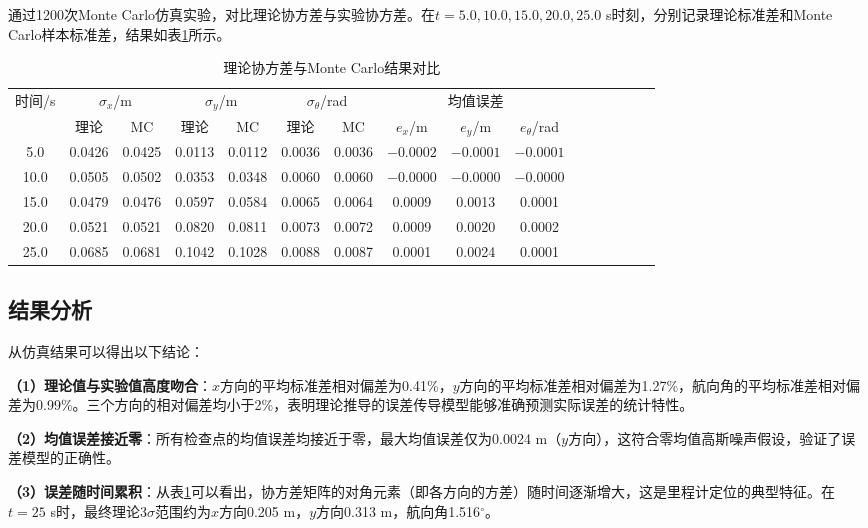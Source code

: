 \documentclass[12pt,a4paper]{article}
\begin{document}
通过1200次Monte Carlo仿真实验，对比理论协方差与实验协方差。在$t=5.0, 10.0, 15.0, 20.0, 25.0$ s时刻，分别记录理论标准差和Monte Carlo样本标准差，结果如表\ref{tab:results}所示。

\begin{table}[H]
\centering
\caption{理论协方差与Monte Carlo结果对比}
\label{tab:results}
\begin{adjustbox}{max width=\textwidth}
\begin{tabular}{c*{2}{cc}*{2}{cc}*{2}{cc}ccc}
\toprule
\multirow{2}{*}{时间/s} & \multicolumn{2}{c}{$\sigma_x$/m} & \multicolumn{2}{c}{$\sigma_y$/m} & \multicolumn{2}{c}{$\sigma_\theta$/rad} & \multicolumn{3}{c}{均值误差} \\
\cmidrule(lr){2-3} \cmidrule(lr){4-5} \cmidrule(lr){6-7} \cmidrule(lr){8-10}
 & 理论 & MC & 理论 & MC & 理论 & MC & $e_x$/m & $e_y$/m & $e_\theta$/rad \\
\midrule
5.0 & 0.0426 & 0.0425 & 0.0113 & 0.0112 & 0.0036 & 0.0036 & $-0.0002$ & $-0.0001$ & $-0.0001$ \\
10.0 & 0.0505 & 0.0502 & 0.0353 & 0.0348 & 0.0060 & 0.0060 & $-0.0000$ & $-0.0000$ & $-0.0000$ \\
15.0 & 0.0479 & 0.0476 & 0.0597 & 0.0584 & 0.0065 & 0.0064 & 0.0009 & 0.0013 & 0.0001 \\
20.0 & 0.0521 & 0.0521 & 0.0820 & 0.0811 & 0.0073 & 0.0072 & 0.0009 & 0.0020 & 0.0002 \\
25.0 & 0.0685 & 0.0681 & 0.1042 & 0.1028 & 0.0088 & 0.0087 & 0.0001 & 0.0024 & 0.0001 \\
\bottomrule
\end{tabular}
\end{adjustbox}
\end{table}

\subsection{结果分析}

从仿真结果可以得出以下结论：

\textbf{（1）理论值与实验值高度吻合}：$x$方向的平均标准差相对偏差为0.41\%，$y$方向的平均标准差相对偏差为1.27\%，航向角的平均标准差相对偏差为0.99\%。三个方向的相对偏差均小于2\%，表明理论推导的误差传导模型能够准确预测实际误差的统计特性。

\textbf{（2）均值误差接近零}：所有检查点的均值误差均接近于零，最大均值误差仅为0.0024 m（$y$方向），这符合零均值高斯噪声假设，验证了误差模型的正确性。

\textbf{（3）误差随时间累积}：从表\ref{tab:results}可以看出，协方差矩阵的对角元素（即各方向的方差）随时间逐渐增大，这是里程计定位的典型特征。在$t=25$ s时，最终理论$3\sigma$范围约为$x$方向0.205 m，$y$方向0.313 m，航向角1.516$^\circ$。
\end{document}

